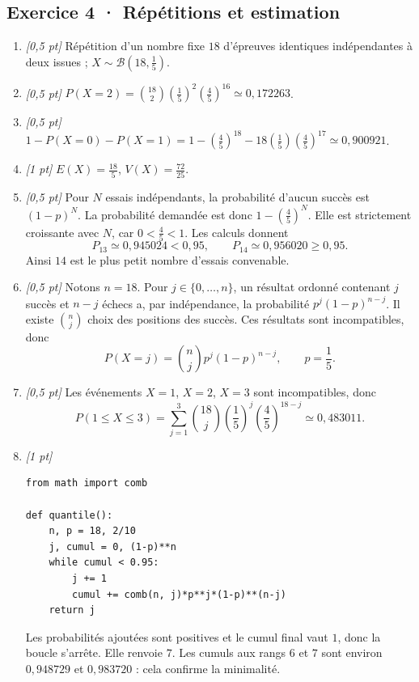 \subsection*{Exercice 4 · Répétitions et estimation}\begin{enumerate}

\item \textit{[0,5 pt]} Répétition d'un nombre fixe $18$ d'épreuves identiques indépendantes à deux issues ; $X\sim\mathcal B(18,\frac{1}{5})$.

\item \textit{[0,5 pt]} $P(X=2)=\binom{18}2(\frac{1}{5})^2(\frac{4}{5})^{16}\simeq0{,}172263$.

\item \textit{[0,5 pt]} $1-P(X=0)-P(X=1)=1-(\frac{4}{5})^{18}-18(\frac{1}{5})(\frac{4}{5})^{17}\simeq0{,}900921$.

\item \textit{[1 pt]} $E(X)=\frac{18}{5}$, $V(X)=\frac{72}{25}$.

\item \textit{[0,5 pt]} Pour $N$ essais indépendants, la probabilité d'aucun succès est $(1-p)^N$. La probabilité demandée est donc $1-(\frac{4}{5})^N$. Elle est strictement croissante avec $N$, car $0<\frac{4}{5}<1$. Les calculs donnent
\[P_{13}\simeq0{,}945024<0{,}95,\qquad P_{14}\simeq0{,}956020\ge0{,}95.\]
Ainsi $14$ est le plus petit nombre d'essais convenable.

\item \textit{[0,5 pt]} Notons $n=18$. Pour $j\in\{0,\ldots,n\}$, un résultat ordonné contenant $j$ succès et $n-j$ échecs a, par indépendance, la probabilité $p^j(1-p)^{n-j}$. Il existe $\binom nj$ choix des positions des succès. Ces résultats sont incompatibles, donc
\[P(X=j)=\binom nj p^j(1-p)^{n-j},\qquad p=\frac{1}{5}.\]

\item \textit{[0,5 pt]} Les événements $X=1$, $X=2$, $X=3$ sont incompatibles, donc
\[P(1\le X\le3)=\sum_{j=1}^3\binom{18}j(\frac{1}{5})^j(\frac{4}{5})^{18-j}\simeq0{,}483011.\]


\item \textit{[1 pt]} 
\begin{lstlisting}
from math import comb

def quantile():
    n, p = 18, 2/10
    j, cumul = 0, (1-p)**n
    while cumul < 0.95:
        j += 1
        cumul += comb(n, j)*p**j*(1-p)**(n-j)
    return j
\end{lstlisting}
Les probabilités ajoutées sont positives et le cumul final vaut $1$, donc la boucle s'arrête. Elle renvoie $7$. Les cumuls aux rangs $6$ et $7$ sont environ $0{,}948729$ et $0{,}983720$ : cela confirme la minimalité.

\end{enumerate}

